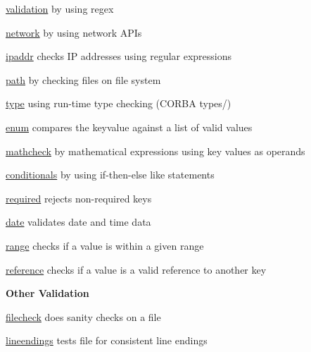 \begin{DoxyItemize}
\item \hyperlink{md_src_plugins_validation_README_src_plugins_validation_README_md}{validation} by using regex
\item \hyperlink{md_src_plugins_network_README_src_plugins_network_README_md}{network} by using network A\+P\+Is
\item \hyperlink{md_src_plugins_ipaddr_README_src_plugins_ipaddr_README_md}{ipaddr} checks IP addresses using regular expressions
\item \hyperlink{md_src_plugins_path_README_src_plugins_path_README_md}{path} by checking files on file system
\item \hyperlink{md_src_plugins_type_README_src_plugins_type_README_md}{type} using run-\/time type checking (C\+O\+R\+BA types/)
\item \hyperlink{md_src_plugins_enum_README_src_plugins_enum_README_md}{enum} compares the keyvalue against a list of valid values
\item \hyperlink{md_src_plugins_mathcheck_README_src_plugins_mathcheck_README_md}{mathcheck} by mathematical expressions using key values as operands
\item \hyperlink{md_src_plugins_conditionals_README_src_plugins_conditionals_README_md}{conditionals} by using if-\/then-\/else like statements
\item \hyperlink{md_src_plugins_required_README_src_plugins_required_README_md}{required} rejects non-\/required keys
\item \hyperlink{md_src_plugins_date_README_src_plugins_date_README_md}{date} validates date and time data
\item \hyperlink{md_src_plugins_range_README_src_plugins_range_README_md}{range} checks if a value is within a given range
\item \hyperlink{md_src_plugins_reference_README_src_plugins_reference_README_md}{reference} checks if a value is a valid reference to another key
\end{DoxyItemize}

{\bfseries Other Validation}


\begin{DoxyItemize}
\item \hyperlink{md_src_plugins_filecheck_README_src_plugins_filecheck_README_md}{filecheck} does sanity checks on a file
\item \hyperlink{md_src_plugins_lineendings_README_src_plugins_lineendings_README_md}{lineendings} tests file for consistent line endings
\end{DoxyItemize}

